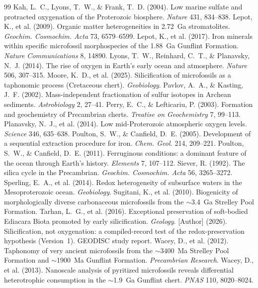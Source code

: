 \documentclass[11pt]{article}
\begin{document}
\begin{thebibliography}{99}
 Kah, L.~C., Lyons, T.~W., \& Frank, T.~D. (2004). Low marine
sulfate and protracted oxygenation of the Proterozoic biosphere. \textit{Nature} 431, 834--838.
 Lepot, K., et al. (2009). Organic matter heterogeneities in
2.72~Ga stromatolites. \textit{Geochim. Cosmochim. Acta} 73, 6579--6599.
 Lepot, K., et al. (2017). Iron minerals within specific
microfossil morphospecies of the 1.88~Ga Gunflint Formation. \textit{Nature Communications} 8, 14890.
 Lyons, T.~W., Reinhard, C.~T., \& Planavsky, N.~J. (2014).
The rise of oxygen in Earth's early ocean and atmosphere. \textit{Nature} 506, 307--315.
 Moore, K.~D., et al. (2025). Silicification of microfossils
as a taphonomic process (Cretaceous chert). \textit{Geobiology}.
 Pavlov, A.~A., \& Kasting, J.~F. (2002).
Mass-independent fractionation of sulfur isotopes in Archean sediments. \textit{Astrobiology} 2,
27--41.
 Perry, E.~C., \& Lefticariu, P. (2003). Formation and
geochemistry of Precambrian cherts. \textit{Treatise on Geochemistry} 7, 99--113.
 Planavsky, N.~J., et al. (2014). Low
mid-Proterozoic atmospheric oxygen levels. \textit{Science} 346, 635--638.
 Poulton, S.~W., \& Canfield, D.~E. (2005).
Development of a sequential extraction procedure for iron. \textit{Chem. Geol.} 214, 209--221.
 Poulton, S.~W., \& Canfield, D.~E. (2011).
Ferruginous conditions: a dominant feature of the ocean through Earth's history. \textit{Elements}
7, 107--112.
 Siever, R. (1992). The silica cycle in the Precambrian.
\textit{Geochim. Cosmochim. Acta} 56, 3265--3272.
 Sperling, E.~A., et al. (2014). Redox heterogeneity of
subsurface waters in the Mesoproterozoic ocean. \textit{Geobiology}.
 Sugitani, K., et al. (2010). Biogenicity of
morphologically diverse carbonaceous microfossils from the $\sim$3.4~Ga Strelley Pool Formation.
 Tarhan, L.~G., et al. (2016). Exceptional preservation of
soft-bodied Ediacara Biota promoted by early silicification. \textit{Geology}.
 [Author] (2026). Silicification, not oxygenation: a compiled-record
test of the redox-preservation hypothesis (Version~1). GEODISC study report.
 Wacey, D., et al. (2012). Taphonomy of very ancient
microfossils from the $\sim$3400~Ma Strelley Pool Formation and $\sim$1900~Ma Gunflint Formation.
\textit{Precambrian Research}.
 Wacey, D., et al. (2013). Nanoscale analysis of pyritized
microfossils reveals differential heterotrophic consumption in the $\sim$1.9~Ga Gunflint chert.
\textit{PNAS} 110, 8020--8024.
\end{thebibliography}
\end{document}
